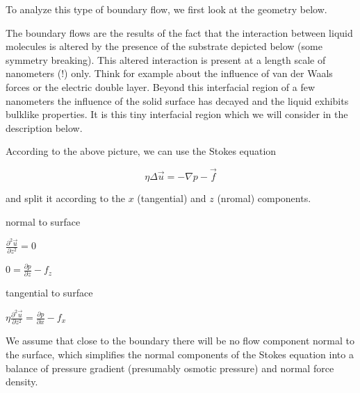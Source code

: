 \documentclass[letterpaper,10pt,english]{sphinxmanual}
\let\sphinxpxdimen\pdfpxdimen\else\newdimen\sphinxpxdimen
\begin{document}
\sphinxAtStartPar
To analyze this type of boundary flow, we first look at the geometry below.

\noindent\sphinxincludegraphics[width=782\sphinxpxdimen,height=224\sphinxpxdimen]{{boundary_flow}.png}

\sphinxAtStartPar
The boundary flows are the results of the fact that the interaction between liquid molecules is altered by the presence of the substrate depicted below (some symmetry breaking). This altered interaction is present at a length scale of nanometers (!) only. Think for example about the influence of van der Waals forces or the electric double layer. Beyond this interfacial region of a few nanometers the influence of the solid surface has decayed and the liquid exhibits bulk\sphinxhyphen{}like properties. It is
this tiny interfacial region which we will consider in the description below.

\sphinxAtStartPar
According to the above picture, we can use the Stokes equation

\sphinxAtStartPar
\begin{equation}
\eta \Delta \vec{u}= -\nabla p-\vec{f}
\end{equation}

\sphinxAtStartPar
and split it according to the \(x\) (tangential) and \(z\) (nromal) components.







\sphinxAtStartPar
normal to surface



\sphinxAtStartPar
\(\frac{\partial^2 \vec{u}}{\partial z^2}=0\)



\sphinxAtStartPar
\(0=\frac{\partial p}{\partial z}-f_z\)







\sphinxAtStartPar
tangential to surface



\sphinxAtStartPar
\(\eta \frac{\partial^2 \vec{u}}{\partial z^2}=\frac{\partial p}{\partial x}-f_x\)





\sphinxAtStartPar
We assume that close to the boundary there will be no flow component normal to the surface, which simplifies the normal components of the Stokes equation into a balance of pressure gradient (presumably osmotic pressure) and normal force density.
\end{document}
